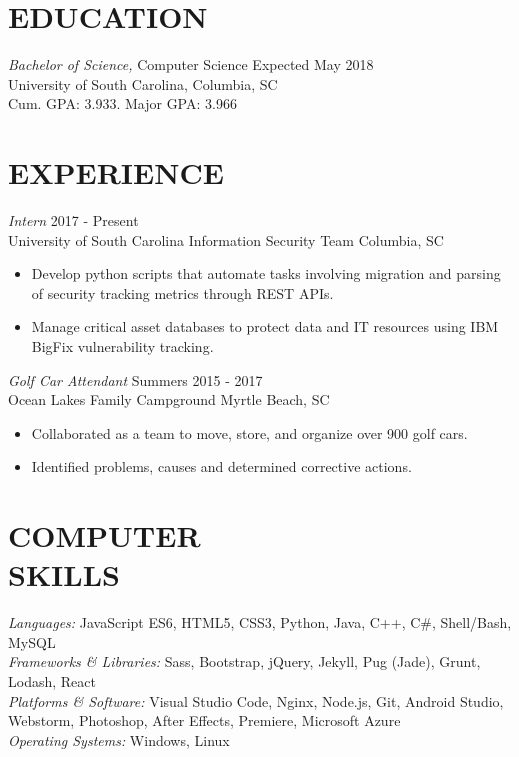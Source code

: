 \documentclass[line,margin]{res}
\begin{document}
\address{800 State St. Apt. 230}
\address{West Columbia, SC 29169}

\begin{resume}
 
\section{EDUCATION} {\sl Bachelor of Science,} 
				Computer Science \hfill Expected May 2018 \\
                University of South Carolina, Columbia, SC \\
                Cum. GPA: 3.933. Major GPA: 3.966
                 
\section{EXPERIENCE} {\sl Intern} \hfill 2017 - Present \\
                University of South Carolina Information Security Team \hfill Columbia, SC
                 \begin{itemize}  \itemsep -2pt %
                 \item Develop python scripts that automate tasks involving migration and parsing of security tracking metrics through REST APIs.
                 \item Manage critical asset databases to protect data and IT resources using IBM BigFix vulnerability tracking.
                \end{itemize}
                {\sl Golf Car Attendant} \hfill Summers 2015 - 2017\\
                Ocean Lakes Family Campground \hfill Myrtle Beach, SC
                 \begin{itemize}  \itemsep -2pt %
                 \item Collaborated as a team to move, store, and organize over 900 golf cars.
                 \item Identified problems, causes and determined corrective actions.
                 
                \end{itemize}

\section{COMPUTER \\ SKILLS} {\sl Languages:} 
				JavaScript ES6, HTML5, CSS3, Python, Java, 
				C++, C\#, Shell/Bash, MySQL \\
                {\sl Frameworks \& Libraries:}
                Sass, Bootstrap, jQuery, Jekyll, Pug (Jade), Grunt, Lodash, React\\
                {\sl Platforms \& Software:}
                Visual Studio Code, Nginx, Node.js, Git, Android Studio, 
                Webstorm, Photoshop, After Effects, Premiere, Microsoft Azure \\
                {\sl Operating Systems:}
                Windows, Linux
                

\end{resume}
\end{document}

